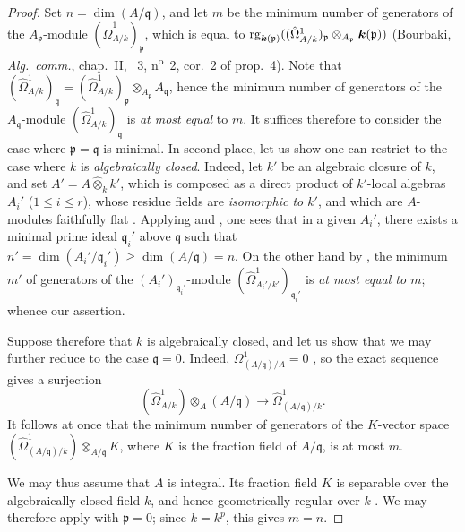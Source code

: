 
\begin{proof}
Set $n=\dim(A/\mathfrak{q})$, and let $m$ be the minimum number of generators of the $A_\mathfrak{p}$-module $(\hat{\Omega}^1_{A/k})_\mathfrak{p}$, which is equal to $\operatorname{rg}_{\boldsymbol{k}(\mathfrak{p})}((\hat{\Omega}^1_{A/k})_\mathfrak{p}\otimes_{A_\mathfrak{p}}\boldsymbol{k}(\mathfrak{p}))$ (Bourbaki, \emph{Alg.\ comm.}, chap.~II, \textsection~3, n\textsuperscript{o}~2, cor.~2 of prop.~4).
Note that $(\hat{\Omega}^1_{A/k})_\mathfrak{q}=(\hat{\Omega}^1_{A/k})_\mathfrak{p}\otimes_{A_\mathfrak{p}}A_\mathfrak{q}$, hence the minimum number of generators of the $A_\mathfrak{q}$-module $(\hat{\Omega}^1_{A/k})_\mathfrak{q}$ is \emph{at most equal} to $m$.
It suffices therefore to consider the case where $\mathfrak{p}=\mathfrak{q}$ is minimal.
In second place, let us show one can restrict to the case where $k$ is \emph{algebraically closed}.
Indeed, let $k'$ be an algebraic closure of $k$, and set $A'=A\widehat{\otimes}_kk'$, which is composed as a direct product of $k'$-local algebras $A_i'$ ($1\leq i\leq r$), whose residue fields are \emph{isomorphic to $k'$}, and which are $A$-modules faithfully flat .
Applying  and , one sees that in a given $A_i'$, there exists a minimal prime ideal $\mathfrak{q}_i'$ above $\mathfrak{q}$ such that $n'=\dim(A_i'/\mathfrak{q}_i')\geq\dim(A/\mathfrak{q})=n$.
On the other hand by , the minimum $m'$ of generators of the $(A_i')_{\mathfrak{q}_i'}$-module $(\hat{\Omega}^1_{A_i'/k'})_{\mathfrak{q}_i'}$ is \emph{at most equal to $m$}; whence our assertion.

Suppose therefore that $k$ is algebraically closed, and let us show that we may further reduce to the case $\mathfrak q=0$. Indeed, $\Omega^1_{(A/\mathfrak q)/A}=0$ , so the exact sequence  gives a surjection
\[
  (\hat{\Omega}^1_{A/k})\otimes_{A}(A/\mathfrak q)
  \longrightarrow \hat{\Omega}^1_{(A/\mathfrak q)/k}.
\]
It follows at once that the minimum number of generators of the $K$-vector space $(\hat{\Omega}^1_{(A/\mathfrak q)/k})\otimes_{A/\mathfrak q}K$, where $K$ is the fraction field of $A/\mathfrak q$, is at most $m$.

We may thus assume that $A$ is integral. Its fraction field $K$ is separable over the algebraically closed field $k$, and hence geometrically regular over $k$ . We may therefore apply  with $\mathfrak p=0$; since $k=k^p$, this gives $m=n$.
\end{proof}

